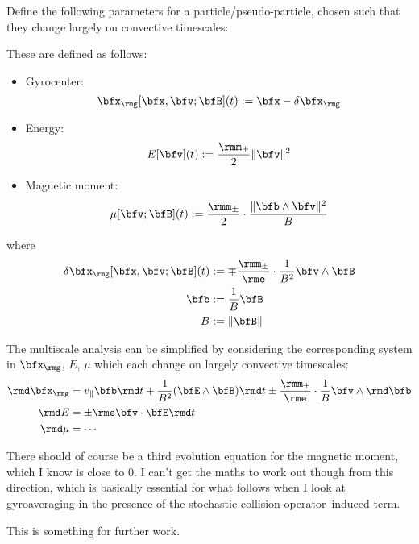     Define the following parameters for a particle/pseudo-particle, chosen such that they change largely on convective timescales:
    
    \begin{definition}
        These are defined as follows:
        \begin{itemize}
            \item  Gyrocenter:
            \begin{equation}
                \bfx_{\rmg}[\bfx, \bfv; \bfB](t)  :=  \bfx - \delta\bfx_{\rmg}
            \end{equation}
            \item  Energy:
            \begin{equation}
                E[\bfv](t)  :=  \frac{\rmm_{\pm}}{2}\|\bfv\|^{2}
            \end{equation}
            \item  Magnetic moment:
            \begin{equation}
                \mu[\bfv; \bfB](t)  :=  \frac{\rmm_{\pm}}{2}\cdot\frac{\|\bfb\wedge\bfv\|^{2}}{B}
            \end{equation}
        \end{itemize}
        where
        \begin{align}
            \delta\bfx_{\rmg}[\bfx, \bfv; \bfB](t)  &:=  \mp \frac{\rmm_{\pm}}{\rme}\cdot\frac{1}{B^{2}}\bfv\wedge\bfB  \\
                                              \bfb  &:=  \frac{1}{B}\bfB  \\
                                                 B  &:=  \|\bfB\|
        \end{align}
    \end{definition}
    
    The multiscale analysis can be simplified by considering the corresponding system in $\bfx_{\rmg}$, $E$, $\mu$ which each change on largely convective timescales:
    \begin{align}
           \rmd\bfx_{\rmg}  &=  v_{\parallel}\bfb\rmd t + \frac{1}{B^{2}}(\bfE\wedge\bfB)\rmd t \pm \frac{\rmm_{\pm}}{\rme}\cdot\frac{1}{B}\bfv\wedge\rmd\bfb  \\
                    \rmd E  &=  \pm\rme\bfv\cdot\bfE\rmd t  \\
                   \rmd\mu  &=  \cdots
    \end{align}

    \begin{remark}
        There should of course be a third evolution equation for the magnetic moment, which I know is close to 0. I can't get the maths to work out though from this direction, which is basically essential for what follows when I look at gyroaveraging in the presence of the stochastic collision operator--induced term.

        This is something for further work.
    \end{remark}
    
